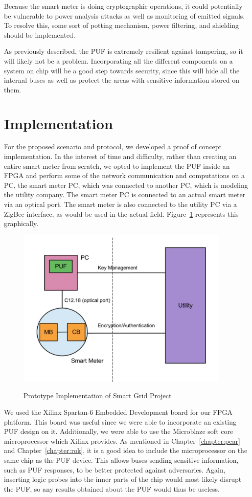 Because the smart meter is doing cryptographic operations, it could potentially be vulnerable to power analysis
attacks as well as monitoring of emitted signals. To resolve this, some sort of potting mechanism, power filtering,
and shielding should be implemented. 

As previously described, the PUF is extremely resilient against tampering, so it will likely not be a problem.
Incorporating all the different components on a system on chip will be a good step towards security, since this will
hide all the internal buses as well as protect the areas with sensitive information stored on them.

\section{Implementation}
For the proposed scenario and protocol, we developed a proof of concept implementation. In the interest of time and
difficulty, rather than creating an entire smart meter from scratch, we opted to implement the 
PUF inside an FPGA and perform some of the network communication and computations on a PC, the smart meter
PC, which was connected to another PC, which is modeling the utility company. The smart meter PC is connected
to an actual smart meter via an optical port. The smart meter is also connected to the utility PC via a ZigBee interface,
as would be used in the actual field. Figure~\ref{fig:doeimpl} represents this graphically.

\begin{figure}[!ht]
\includegraphics[width=400px]{images/doe_impl.jpg}
\label{fig:doeimpl}
\caption{Prototype Implementation of Smart Grid Project}
\end{figure}
\FloatBarrier

We used the Xilinx Spartan-6 Embedded Development board for our FPGA platform. This board was useful since we 
were able to incorporate an existing PUF design on it. Additionally, we were able to use the Microblaze soft core
microprocessor which Xilinx provides. As mentioned in Chapter~\ref{chapter:pear} and Chapter~\ref{chapter:rok},
it is a good idea to include the microprocessor on the same chip as the PUF device. This allows buses sending
sensitive information, such as PUF responses, to be better protected against adversaries. Again, inserting logic
probes into the inner parts of the chip would most likely disrupt the PUF, so any results obtained about the PUF would
thus be useless.

